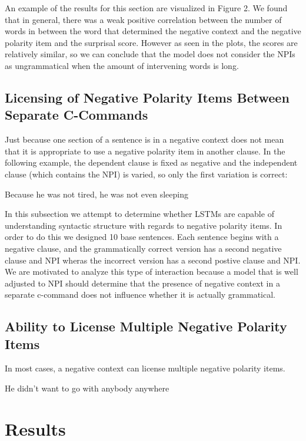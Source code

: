 \documentclass[11pt, round]{article}
\begin{document}
An example of the results for this section are visualized in Figure 2. We found that in general, there was a weak positive correlation between the number of words in between the word that determined the negative context and the negative polarity item and the surprisal score. However as seen in the plots, the scores are relatively similar, so we can conclude that the model does not consider the NPIs as ungrammatical when the amount of intervening words is long.
\subsection{Licensing of Negative Polarity Items Between Separate C-Commands}
Just because one section of a sentence is in a negative context does not mean that it is appropriate to use a negative polarity item in another clause. In the following example, the dependent clause is fixed as negative and the independent clause (which contains the NPI) is varied, so only the first variation is correct:
\begin{exe}
\ex
\begin{xlist}
\ex Because he was not tired, he was not even sleeping
\end{xlist}
\end{exe}
In this subsection we attempt to determine whether LSTMs are capable of understanding syntactic structure with regards to negative polarity items. In order to do this we designed 10 base sentences. Each sentence begins with a negative clause, and the grammatically correct version has a second negative clause and NPI wheras the incorrect version has a second postive clause and NPI. We are motivated to analyze this type of interaction because a model that is well adjusted to NPI should determine that the presence of negative context in a separate c-command does not influence whether it is actually grammatical.
\subsection{Ability to License Multiple Negative Polarity Items}
In most cases, a negative context can license multiple negative polarity items.
\begin{exe}
\ex
\begin{xlist}
\ex He didn't want to go with anybody anywhere
\end{xlist}
\end{exe}

\section{Results}


\end{document}
